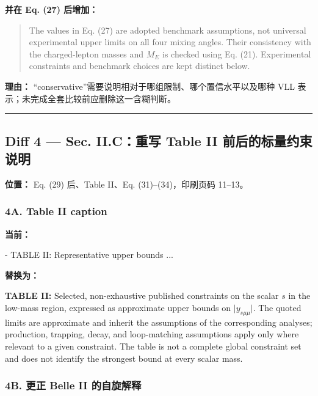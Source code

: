 \documentclass[
]{article}
\newenvironment{Shaded}{}{}
\newcommand{\StringTok}[1]{\textcolor[rgb]{0.25,0.44,0.63}{#1}}
\begin{document}
\textbf{并在 Eq. (27) 后增加：}

\begin{quote}
The values in Eq. (27) are adopted benchmark assumptions, not universal
experimental upper limits on all four mixing angles. Their consistency
with the charged-lepton masses and \(M_E\) is checked using Eq. (21).
Experimental constraints and benchmark choices are kept distinct below.
\end{quote}

\textbf{理由：}
``conservative''需要说明相对于哪组限制、哪个置信水平以及哪种 VLL
表示；未完成全套比较前应删除这一含糊判断。

\begin{center}\rule{0.5\linewidth}{0.5pt}\end{center}

\subsection{Diff 4 --- Sec. II.C：重写 Table II
前后的标量约束说明}\label{diff-4-sec.-ii.cux91cdux5199-table-ii-ux524dux540eux7684ux6807ux91cfux7ea6ux675fux8bf4ux660e}

\textbf{位置：} Eq. (29) 后、Table II、Eq. (31)--(34)，印刷页码 11--13。

\subsubsection{4A. Table II caption}\label{a.-table-ii-caption}

\textbf{当前：}

\begin{Shaded}
\begin{Highlighting}[]
\StringTok{{-} TABLE II: Representative upper bounds ...}
\end{Highlighting}
\end{Shaded}

\textbf{替换为：}

\noindent
\textbf{TABLE II:} Selected, non-exhaustive published constraints on the
scalar \(s\) in the low-mass region, expressed as approximate upper bounds on
\(\lvert y_{s\mu\mu}\rvert\). The quoted limits are approximate and inherit the
assumptions of the corresponding analyses; production, trapping, decay,
and loop-matching assumptions apply only where relevant to a given
constraint. The table is not a complete global constraint set and does
not identify the strongest bound at every scalar mass.

\subsubsection{4B. 更正 Belle II
的自旋解释}\label{b.-ux66f4ux6b63-belle-ii-ux7684ux81eaux65cbux89e3ux91ca}
\end{document}

